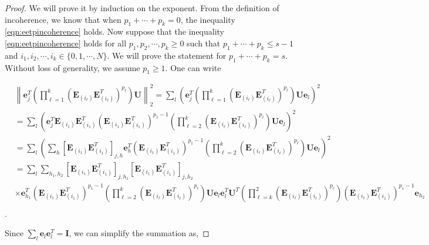 \documentclass[twoside,11pt]{article}
\newcommand{\norm}[1]{\left\lVert#1\right\rVert}
\newcommand{\matE}{\mathbf{E}}
\newcommand{\matI}{\mathbf{I}}
\newcommand{\matU}{\mathbf{U}}
\newcommand{\vece}{\mathbf{e}}
\begin{document}
\begin{proof}
We will prove it by induction on the exponent.
From the definition of incoherence, we know that when $p_1+\cdots+p_k=0$, the inequality \eqref{eqn:eetpincoherence} holds.
Now suppose that the inequality \eqref{eqn:eetpincoherence} holds for all $p_1,p_2,\cdots,p_k\ge 0$ such that $p_1+\cdots+p_k\le s-1$ and $i_1,i_2,\cdots,i_k\in\{0,1,\cdots,N\}$. We will prove the statement for $p_1+\cdots+p_k= s$. Without loss of generality, we assume $p_1\ge 1$. One can write 


\begin{equation}
\begin{aligned}
& \norm{\vece_j^T\left(\prod_{\ell=1}^k(\matE_{(i_\ell)}\matE_{(i_\ell)}^T)^{p_\ell}\right)\matU}_2^2= \sum_l\left(\vece_j^T\left(\prod_{\ell=1}^k(\matE_{(i_\ell)}\matE_{(i_\ell)}^T)^{p_\ell}\right)\matU\vece_l\right)^2\\    &=\sum_l\left(\vece_j^T\matE_{(i_1)}\matE_{(i_1)}^T(\matE_{(i_1)}\matE_{(i_1)}^T)^{p_1-1}\left(\prod_{\ell=2}^k(\matE_{(i_\ell)}\matE_{(i_\ell)}^T)^{p_\ell}\right)\matU\vece_l\right)^2\\
&=\sum_l\left(\sum_h\left[\matE_{(i_1)}\matE_{(i_1)}^T\right]_{j,h}\vece_h^T(\matE_{(i_1)}\matE_{(i_1)}^T)^{p_1-1}\left(\prod_{\ell=2}^k(\matE_{(i_\ell)}\matE_{(i_\ell)}^T)^{p_\ell}\right)\matU\vece_l\right)^2\\
&=\sum_l\sum_{h_1,h_2}\left[\matE_{(i_1)}\matE_{(i_1)}^T\right]_{j,h_1}\left[\matE_{(i_1)}\matE_{(i_1)}^T\right]_{j,h_2}\\
&\times\vece_{h_1}^T(\matE_{(i_1)}\matE_{(i_1)}^T)^{p_1-1}\left(\prod_{\ell=2}^k(\matE_{(i_\ell)}\matE_{(i_\ell)}^T)^{p_\ell}\right)\matU\vece_l\vece_l^T\matU^T\left(\prod_{\ell=k}^2(\matE_{(i_\ell)}\matE_{(i_\ell)}^T)^{p_\ell}\right)(\matE_{(i_1)}\matE_{(i_1)}^T)^{p_1-1}\vece_{h_2}\\
\end{aligned}
\end{equation}.

Since $\sum_l\vece_l\vece_l^T=\matI$, we can simplify the summation as,


\end{proof}
\end{document}
